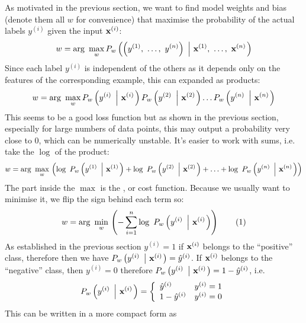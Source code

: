 \documentclass[a4paper]{article}
\begin{document}
As motivated in the previous section, we want to find model weights and bias (denote them all $w$ for convenience) that maximise the probability of the actual labels $y^{(i)}$ given the input $\textbf{x}^{(i)}$:
\begin{equation*}
    w = \arg \ \underset{w}{\mathop{\max }}\,{{P}_{w}}\left( \left( y^{(1)},\ \ldots,\ y^{(n)} \right)\ 
    \left| \ \bx^{(1)},\ \ldots,\ \bx^{(n)}  \right. \right)
\end{equation*}
Since each label $y^{(i)}$ is independent of the others as it depends only on the features of the corresponding example, this can expanded as products:
\[
    w = \arg \ \underset{w}{\mathop{\max }}\,
    P_{w}\left( y^{(i)} \ \left| \ \textbf{x}^{(i)} \right. \right)
    P_{w}\left( y^{(2)} \ \left| \ \textbf{x}^{(2)} \right. \right)
    \ldots
    P_{w}\left( y^{(n)} \ \left| \ \textbf{x}^{(n)} \right. \right)
\]
This seems to be a good loss function but as shown in the previous section, especially for large numbers of data points, this may output a probability very close to 0, which can be numerically unstable. It's easier to work with sums, i.e. take the $\log$ of the product:
\[
    w = \arg \ \underset{w}{\mathop{\max }}\, 
    \left (
    \log \ P_w\left( y^{(1)} \ \left| \ \bx^{(1)} \right. \right)+
    \log \ P_w\left( y^{(2)} \ \left| \ \bx^{(2)} \right. \right)+
    \ldots+
    \log \ P_w\left( y^{(n)} \ \left| \ \bx^{(n)} \right. \right)
    \right)
\]
The part inside the $\max$ is the , or cost function. Because we usually want to minimise it, we flip the sign behind each term so:
\[
    w = \arg \ \underset{w}{\mathop{\min }}\, 
    \left(
    -\sum \limits _{i=1} ^{n} {\log \ P_w\left( y^{(i)} \ \left| \ \bx^{(i)} \right. \right)}
    \right)
    \tag{1}
\]
As established in the previous section $y^{(i)}=1$ if $\textbf{x}^{(i)}$ belongs to the ``positive'' class, therefore then we have $P_w\left( y^{(i)} \ \left| \ \textbf{x}^{(i)} \right. \right) = \hat{y}^{(i)}$. If $\textbf{x}^{(i)}$ belongs to the ``negative'' class, then $y^{(i)}=0$ therefore $P_w\left( y^{(i)} \ \left| \ \bx^{(i)} \right. \right) = 1 - \hat{y}^{(i)}$, i.e.
\[
P_w\left( y^{(i)} \ \left| \ \textbf{x}^{(i)} \right. \right)= \left\{
\begin{array}{ll}
      \hat{y}^{(i)} & y^{(i)}=1 \\
      1-\hat{y}^{(i)} & y^{(i)}=0\\
\end{array} 
\right. 
\]
This can be written in a more compact form as
\end{document}

